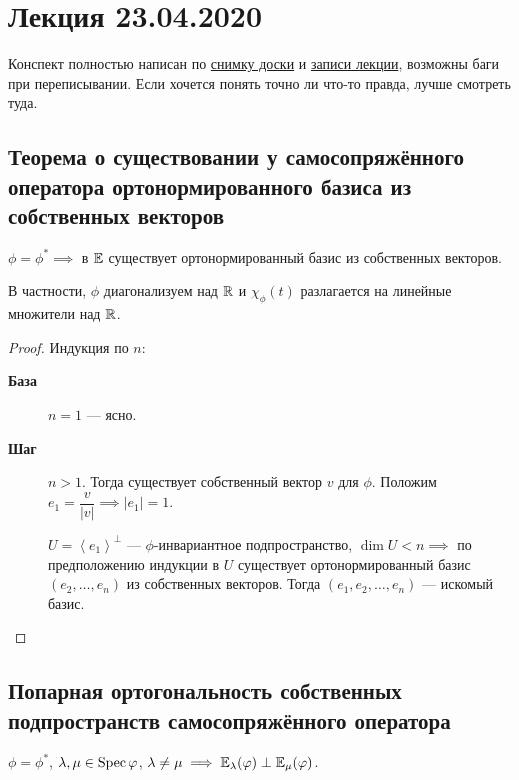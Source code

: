 \section{Лекция 23.04.2020} 

Конспект полностью написан по
\href{https://www.dropbox.com/s/ub0asegwgqxh16l/LA_19-20_osn_Lecture30.svg?dl=0}{снимку доски} и
\href{https://www.youtube.com/watch?v=k49JHc6nCdU}{записи лекции},
возможны баги при переписывании. Если хочется понять точно ли что-то правда, лучше смотреть туда.


\subsection{Теорема о существовании у самосопряжённого оператора ортонормированного базиса из собственных векторов}

\begin{theorem}
    \label{lec30:th}
    $\phi = \phi^* \implies $ в $\mathbb{E}$ существует ортонормированный базис из собственных векторов.

    В частности, $\phi$ диагонализуем над $\mathbb{R}$ и $\chi_{\phi}(t)$ разлагается на линейные множители над $\mathbb{R}$.
\end{theorem}

\begin{proof}Индукция по $n$:
    \begin{description}
    \item[\textbf{База}] $n = 1$ --- ясно.
    \item[\textbf{Шаг}] $n > 1$. Тогда существует собственный вектор $v$ для $\phi$. Положим $e_1 = \dfrac{v}{|v|} \implies |e_1| = 1$.

        $U = \left< e_1 \right>^{\perp}$ --- $\phi$-инвариантное подпространство, $\dim U < n \implies $ по предположению индукции в $U$ существует ортонормированный базис $(e_2, \dots, e_n)$ из собственных векторов. Тогда $(e_1, e_2, \dots, e_n)$ --- искомый базис.
        \qedhere
    \end{description}
\end{proof}


\subsection{Попарная ортогональность собственных подпространств самосопряжённого оператора}

\begin{proposal}
    $\phi = \phi^{*}$, $\lambda, \mu \in \operatorname{\mathop{\mathrm{Spec}}} \varphi$, $\lambda \neq \mu \implies \mathbb{E}_\lambda(\varphi) \perp \mathbb{E}_\mu(\varphi)$.
\end{proposal}

